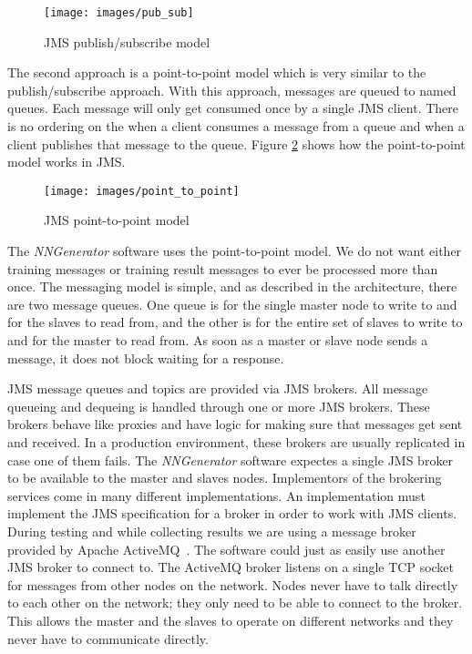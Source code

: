 \begin{figure}[h!]
  \centering
  \texttt{[image: images/pub\_sub]}
  \caption{JMS publish/subscribe model}
  \label{pub_sub}
\end{figure}

The second approach is a point-to-point model which is very similar to the publish/subscribe approach.
With this approach, messages are queued to named queues.
Each message will only get consumed once by a single JMS client.
There is no ordering on the when a client consumes a message from a queue and when a client publishes that message to the queue.
Figure \ref{point_to_point} shows how the point-to-point model works in JMS.

\begin{figure}[h!]
  \centering
  \texttt{[image: images/point\_to\_point]}
  \caption{JMS point-to-point model}
  \label{point_to_point}
\end{figure}

The {\em NNGenerator} software uses the point-to-point model.
We do not want either training messages or training result messages to ever be processed more than once.
The messaging model is simple, and as described in the architecture, there are two message queues. 
One queue is for the single master node to write to and for the slaves to read from, and the other is for the entire set of slaves to write to and for the master to read from. 
As soon as a master or slave node sends a message, it does not block waiting for a response. 

JMS message queues and topics are provided via JMS brokers.
All message queueing and dequeing is handled through one or more JMS brokers.
These brokers behave like proxies and have logic for making sure that messages get sent and received.
In a production environment, these brokers are usually replicated in case one of them fails.
The {\em NNGenerator} software expectes a single JMS broker to be available to the master and slaves nodes.
Implementors of the brokering services come in many different implementations. 
An implementation must implement the JMS specification for a broker in order to work with JMS clients.
During testing and while collecting results we are using a message broker provided by Apache ActiveMQ~\cite{activeMQ}.
The software could just as easily use another JMS broker to connect to. 
The ActiveMQ broker listens on a single TCP socket for messages from other nodes on the network. 
Nodes never have to talk directly to each other on the network; they only need to be able to connect to the broker.  
This allows the master and the slaves to operate on different networks and they never have to communicate directly.

